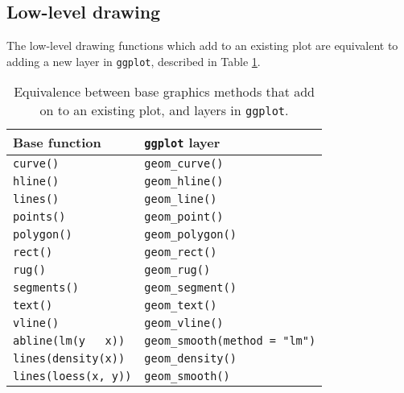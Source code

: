 \subsection{Low-level drawing}

The low-level drawing functions which add to an existing plot are
equivalent to adding a new layer in \texttt{ggplot}, described in Table
\ref{tbl:base-equiv}.

\begin{table}
  \begin{center}
    \begin{tabular}{ll}
      \toprule
      Base function & \texttt{ggplot} layer \\
      \midrule
      \texttt{curve()}    & \texttt{geom\_curve()}      \\
      \texttt{hline()}    & \texttt{geom\_hline()}      \\
      \texttt{lines()}    & \texttt{geom\_line()}       \\
      \texttt{points()}   & \texttt{geom\_point()}      \\
      \texttt{polygon()}  & \texttt{geom\_polygon()}    \\
      \texttt{rect()}     & \texttt{geom\_rect()}       \\
      \texttt{rug()}      & \texttt{geom\_rug()}        \\
      \texttt{segments()} & \texttt{geom\_segment()}    \\
      \texttt{text()}     & \texttt{geom\_text()}       \\
      \texttt{vline()}    & \texttt{geom\_vline()}      \\
      \texttt{abline(lm(y ~ x))}  & \texttt{geom\_smooth(method = "lm")}  \\
      \texttt{lines(density(x))}  & \texttt{geom\_density()}         \\
      \texttt{lines(loess(x, y))} & \texttt{geom\_smooth()}          \\
      \bottomrule
    \end{tabular}
  \end{center}
  \caption{Equivalence between base graphics methods that add on to an existing plot, and layers in \texttt{ggplot}.}
  \label{tbl:base-equiv}
\end{table}

\begin{Shaded}
\begin{Highlighting}[]

\StringTok{ }\NormalTok{()}

\NormalTok{() +}\StringTok{ }\NormalTok{()}
\end{Highlighting}
\end{Shaded}

